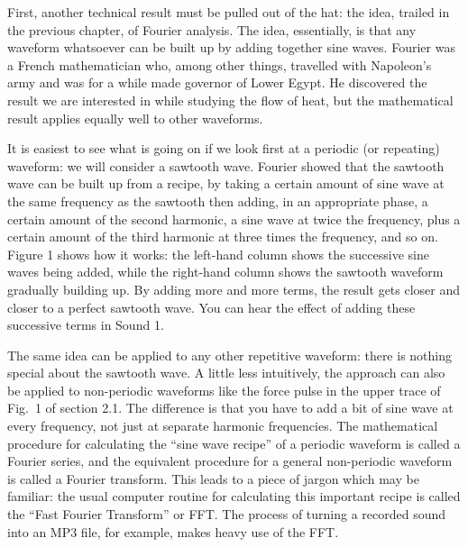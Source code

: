 

  First, another technical result must be pulled out of the hat: the idea, 
  trailed in the previous chapter, of Fourier analysis. The idea, essentially, 
  is that any waveform whatsoever can be built up by adding together sine 
  waves. Fourier was a French mathematician who, among other things, travelled 
  with Napoleon's army and was for a while made governor of Lower Egypt. He 
  discovered the result we are interested in while studying the flow of heat, 
  but the mathematical result applies equally well to other waveforms. 

  It is easiest to see what is going on if we look first at a periodic (or 
  repeating) waveform: we will consider a sawtooth wave. Fourier showed that 
  the sawtooth wave can be built up from a recipe, by taking a certain amount 
  of sine wave at the same frequency as the sawtooth then adding, in an 
  appropriate phase, a certain amount of the second harmonic, a sine wave at 
  twice the frequency, plus a certain amount of the third harmonic at three 
  times the frequency, and so on. Figure 1 shows how it works: the left-hand 
  column shows the successive sine waves being added, while the right-hand 
  column shows the sawtooth waveform gradually building up. By adding more and 
  more terms, the result gets closer and closer to a perfect sawtooth wave. You 
  can hear the effect of adding these successive terms in Sound 1. 



  The same idea can be applied to any other repetitive waveform: there is 
  nothing special about the sawtooth wave. A little less intuitively, the 
  approach can also be applied to non-periodic waveforms like the force pulse 
  in the upper trace of Fig.\ 1 of section 2.1. The difference is that you have 
  to add a bit of sine wave at every frequency, not just at separate harmonic 
  frequencies. The mathematical procedure for calculating the ``sine wave 
  recipe'' of a periodic waveform is called a Fourier series, and the 
  equivalent procedure for a general non-periodic waveform is called a Fourier 
  transform. This leads to a piece of jargon which may be familiar: the usual 
  computer routine for calculating this important recipe is called the ``Fast 
  Fourier Transform'' or FFT. The process of turning a recorded sound into an 
  MP3 file, for example, makes heavy use of the FFT. 

